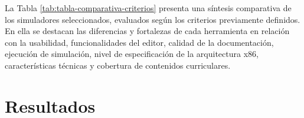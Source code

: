\documentclass[12pt,oneside]{templates/unerthesis}
\begin{document}
La Tabla \ref{tab:tabla-comparativa-criterios} presenta una síntesis comparativa de los simuladores seleccionados, evaluados según los criterios previamente definidos. En ella se destacan las diferencias y fortalezas de cada herramienta en relación con la usabilidad, funcionalidades del editor, calidad de la documentación, ejecución de simulación, nivel de especificación de la arquitectura x86, características técnicas y cobertura de contenidos curriculares.

\begin{table}[!h]
\centering
\caption{\label{tab:tabla-comparativa-criterios}Comparativa según criterios de evaluación preestablecidos}
\centering
{}
\end{table}

\hypertarget{resultados}{%
\section{Resultados}\label{resultados}}
\end{document}

